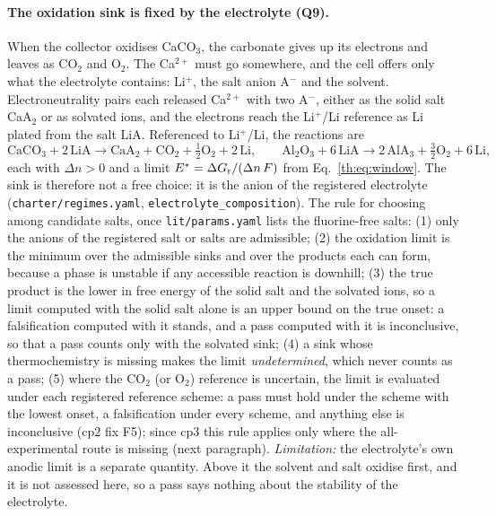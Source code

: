 \paragraph{The oxidation sink is fixed by the electrolyte (Q9).} When the collector oxidises
CaCO$_3$, the carbonate gives up its electrons and leaves as CO$_2$ and O$_2$. The Ca$^{2+}$ must go
somewhere, and the cell offers only what the electrolyte contains: Li$^{+}$, the salt anion A$^{-}$
and the solvent. Electroneutrality pairs each released Ca$^{2+}$ with two A$^{-}$, either as the solid
salt CaA$_2$ or as solvated ions, and the electrons reach the Li$^{+}$/Li reference as Li plated from
the salt LiA. Referenced to Li$^{+}$/Li, the reactions are
\begin{equation}\label{th:eq:sink}
\mathrm{CaCO_3}+2\,\mathrm{LiA}\to\mathrm{CaA_2}+\mathrm{CO_2}+\tfrac12\mathrm{O_2}+2\,\mathrm{Li},\qquad
\mathrm{Al_2O_3}+6\,\mathrm{LiA}\to2\,\mathrm{AlA_3}+\tfrac32\mathrm{O_2}+6\,\mathrm{Li},
\end{equation}
each with $\Delta n>0$ and a limit $E^{*}=\Delta G_\mathrm{r}/(\Delta n\,F)$ from
Eq.~\eqref{th:eq:window}. The sink is therefore not a free choice: it is the anion of the
registered electrolyte (\texttt{charter/regimes.yaml}, \texttt{electrolyte\_composition}). The rule
for choosing among candidate salts, once \texttt{lit/params.yaml} lists the fluorine-free salts:
(1) only the anions of the registered salt or salts are admissible; (2) the oxidation limit is the
minimum over the admissible sinks and over the products each can form, because a phase is
unstable if any accessible reaction is downhill; (3) the true product is the lower in free energy of
the solid salt and the solvated ions, so a limit computed with the solid salt alone is an upper
bound on the true onset: a falsification computed with it stands, and a pass computed with it is
inconclusive, so that a pass counts only with the solvated sink; (4) a sink whose thermochemistry
is missing makes the limit \emph{undetermined}, which never counts as a pass; (5) where the
CO$_2$ (or O$_2$) reference is uncertain, the limit is evaluated under each registered reference
scheme: a pass must hold under the scheme with the lowest onset, a falsification under every
scheme, and anything else is inconclusive (cp2 fix F5); since cp3 this rule applies only where the
all-experimental route is missing (next paragraph). \emph{Limitation:} the electrolyte's own
anodic limit is a separate quantity. Above it the solvent and salt oxidise first, and it is not
assessed here, so a pass says nothing about the stability of the electrolyte.

